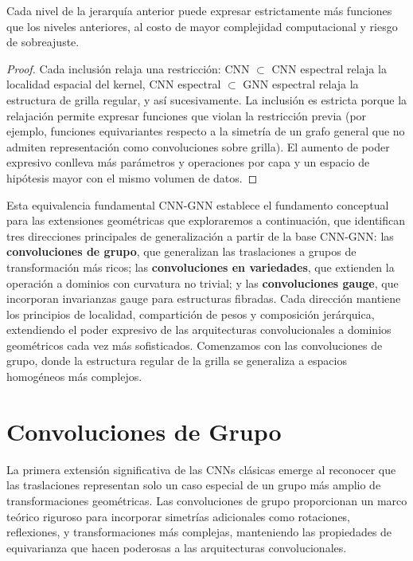 \begin{corollary}\label{cor:poder_expresivo_creciente}
Cada nivel de la jerarquía anterior puede expresar estrictamente más funciones que los niveles anteriores, al costo de mayor complejidad computacional y riesgo de sobreajuste.
\end{corollary}

\begin{proof}
Cada inclusión relaja una restricción: CNN $\subset$ CNN espectral relaja la localidad espacial del kernel, CNN espectral $\subset$ GNN espectral relaja la estructura de grilla regular, y así sucesivamente. La inclusión es estricta porque la relajación permite expresar funciones que violan la restricción previa (por ejemplo, funciones equivariantes respecto a la simetría de un grafo general que no admiten representación como convoluciones sobre grilla). El aumento de poder expresivo conlleva más parámetros y operaciones por capa y un espacio de hipótesis mayor con el mismo volumen de datos.
\end{proof}

Esta equivalencia fundamental CNN-GNN establece el fundamento conceptual para las extensiones geométricas que exploraremos a continuación, que identifican tres direcciones principales de generalización a partir de la base CNN-GNN: las \textbf{convoluciones de grupo}, que generalizan las traslaciones a grupos de transformación más ricos; las \textbf{convoluciones en variedades}, que extienden la operación a dominios con curvatura no trivial; y las \textbf{convoluciones gauge}, que incorporan invarianzas gauge para estructuras fibradas. Cada dirección mantiene los principios de localidad, compartición de pesos y composición jerárquica, extendiendo el poder expresivo de las arquitecturas convolucionales a dominios geométricos cada vez más sofisticados. Comenzamos con las convoluciones de grupo, donde la estructura regular de la grilla se generaliza a espacios homogéneos más complejos.

\section{Convoluciones de Grupo}\label{sec:group_convolutions}

La primera extensión significativa de las \glspl{CNN} clásicas emerge al reconocer que las traslaciones representan solo un caso especial de un grupo más amplio de transformaciones geométricas. Las convoluciones de grupo proporcionan un marco teórico riguroso para incorporar simetrías adicionales como rotaciones, reflexiones, y transformaciones más complejas, manteniendo las propiedades de equivarianza que hacen poderosas a las arquitecturas convolucionales.

